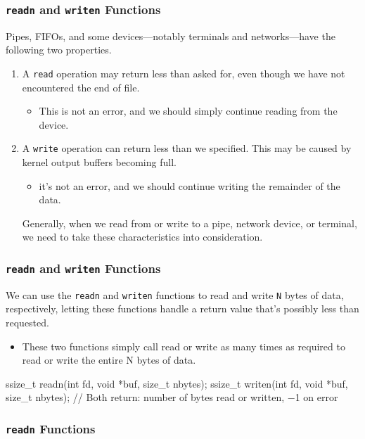 \documentclass[newPxFont,sthlmFooter,nooffset]{beamer}
\begin{document}
\begin{frame}[t]
  \frametitle{\texttt{readn} and \texttt{writen} Functions}
Pipes, FIFOs, and some devices—notably terminals and networks—have the following
two properties.
\begin{enumerate}
\item A \texttt{read} operation may return less than asked for, even though we have not encountered the end of file.
  \begin{itemize}
  \item This is not an error, and we should simply continue reading from the device.
  \end{itemize}
\item A \texttt{write} operation can return less than we specified. This may be caused by kernel output buffers becoming full.
  \begin{itemize}
  \item it’s not an error, and we should continue writing the
    remainder of the data.
  \end{itemize}
Generally, when we read from or write to a pipe, network device, or terminal, we need to take these characteristics into consideration.
\end{enumerate}
\end{frame}

\begin{frame}[t, fragile]
  \frametitle{\texttt{readn} and \texttt{writen} Functions}
We can use the \texttt{readn} and \texttt{writen} functions to read and write \texttt{N} bytes of data, respectively, letting these functions handle a return value that’s possibly less than requested.  
\begin{itemize}
\item These two functions simply call read or write as many times as required to read or write the entire N bytes of data.
\end{itemize}
\begin{codedef}
ssize_t readn(int fd, void *buf, size_t nbytes); 
ssize_t writen(int fd, void *buf, size_t nbytes);
// Both return: number of bytes read or written, −1 on error
\end{codedef}
\end{frame}

\begin{frame}[t]
  \frametitle{\texttt{readn} Functions}
    

\end{frame}
\end{document}
